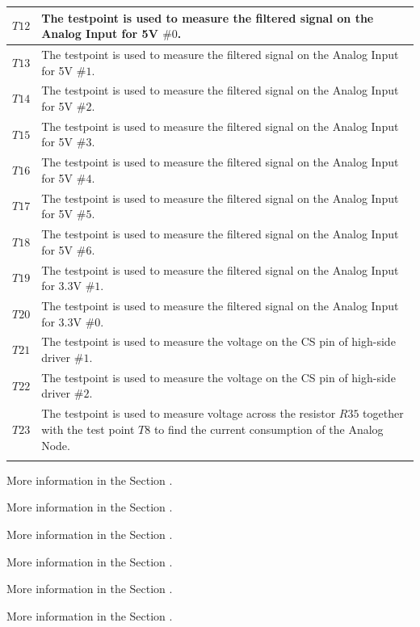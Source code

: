 \documentclass[10pt]{datasheet}
\begin{document}
\begin{table}[H]
\begin{threeparttable}
\begin{tabularx}{\textwidth}{ c | X }
    \hline
    $T12$ & The testpoint is used to measure the filtered signal on the Analog Input for 5V $\#0$.\tnote{5} \\
    \hline
    $T13$ & The testpoint is used to measure the filtered signal on the Analog Input for 5V $\#1$.\tnote{5} \\
    \hline
    $T14$ & The testpoint is used to measure the filtered signal on the Analog Input for 5V $\#2$.\tnote{5} \\
    \hline
    $T15$ & The testpoint is used to measure the filtered signal on the Analog Input for 5V $\#3$.\tnote{5} \\
    \hline
    $T16$ & The testpoint is used to measure the filtered signal on the Analog Input for 5V $\#4$.\tnote{5} \\
    \hline
    $T17$ & The testpoint is used to measure the filtered signal on the Analog Input for 5V $\#5$.\tnote{5} \\
    \hline
    $T18$ & The testpoint is used to measure the filtered signal on the Analog Input for 5V $\#6$.\tnote{5} \\
    \hline
    $T19$ & The testpoint is used to measure the filtered signal on the Analog Input for 3.3V $\#1$.\tnote{5} \\
    \hline
    $T20$ & The testpoint is used to measure the filtered signal on the Analog Input for 3.3V $\#0$.\tnote{5} \\
    \hline
    $T21$ & The testpoint is used to measure the voltage on the CS pin of high-side driver $\#1$.\tnote{6} \\
    \hline
    $T22$ & The testpoint is used to measure the voltage on the CS pin of high-side driver $\#2$.\tnote{6} \\
    \hline
    $T23$ & The testpoint is used to measure voltage across the resistor $R35$ together with the test point $T8$ to find the current consumption of the Analog Node.\tnote{4} \\
    \hline
    \thickhline
\end{tabularx}
\begin{tablenotes}
\item[1] {More information in the Section .}
\item[2] {More information in the Section .}
\item[3] {More information in the Section .}
\item[4] {More information in the Section .}
\item[5] {More information in the Section .}
\item[6] {More information in the Section .}
\end{tablenotes}
\end{threeparttable}
\end{table}
\newpage
\end{document}

